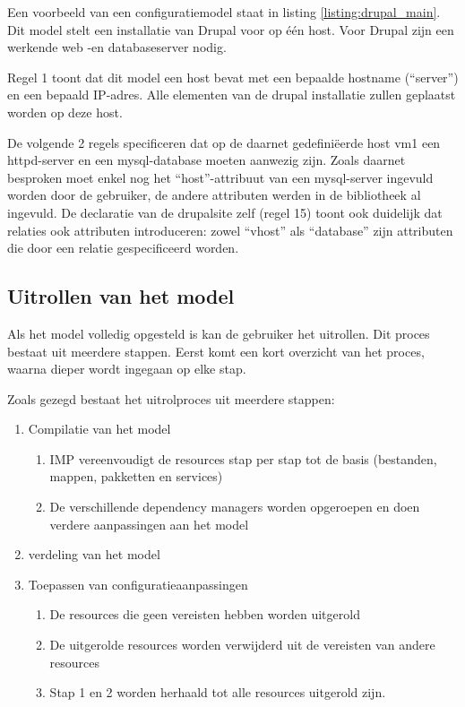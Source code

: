 Een voorbeeld van een configuratiemodel staat in listing \ref{listing:drupal_main}.
Dit model stelt een installatie van Drupal voor op \'e\'en host.
Voor Drupal zijn een werkende web -en databaseserver nodig.



Regel 1 toont dat dit model een host bevat met een bepaalde hostname (``server'') en een bepaald IP-adres.
Alle elementen van de drupal installatie zullen geplaatst worden op deze host.

De volgende 2 regels specificeren dat op de daarnet gedefini\"eerde host vm1 een httpd-server en een mysql-database moeten aanwezig zijn.
Zoals daarnet besproken moet enkel nog het ``host''-attribuut van een mysql-server ingevuld worden door de gebruiker, de andere attributen werden in de bibliotheek al ingevuld.
De declaratie van de drupalsite zelf (regel 15) toont ook duidelijk dat relaties ook attributen introduceren: zowel ``vhost'' als ``database'' zijn attributen die door een relatie gespecificeerd worden.

\subsection{Uitrollen van het model}
\label{sec:IMP_uitrollen}
Als het model volledig opgesteld is kan de gebruiker het uitrollen.
Dit proces bestaat uit meerdere stappen.
Eerst komt een kort overzicht van het proces, waarna dieper wordt ingegaan op elke stap.

Zoals gezegd bestaat het uitrolproces uit meerdere stappen:
\begin{enumerate}
    \item Compilatie van het model
        \begin{enumerate}
            \item IMP vereenvoudigt de resources stap per stap tot de basis (bestanden, mappen, pakketten en services)
            \item De verschillende dependency managers worden opgeroepen en doen verdere aanpassingen aan het model
        \end{enumerate}
    \item verdeling van het model
    \item Toepassen van configuratieaanpassingen
        \begin{enumerate}
            \item De resources die geen vereisten hebben worden uitgerold 
            \item De uitgerolde resources worden verwijderd uit de vereisten van andere resources
            \item Stap 1 en 2 worden herhaald tot alle resources uitgerold zijn.
        \end{enumerate}
\end{enumerate}

